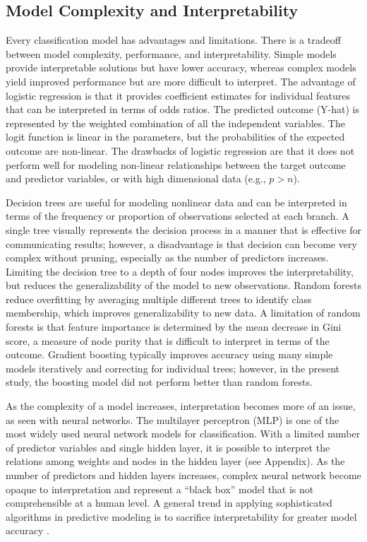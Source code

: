 \documentclass[sigconf]{acmart}
\begin{document}
\subsection{Model Complexity and Interpretability}

Every classification model has advantages and limitations. There is a 
tradeoff between model complexity, performance, and interpretability.
Simple models provide interpretable solutions but have lower accuracy, 
whereas complex models yield improved performance but are more difficult 
to interpret. The advantage of logistic regression is that it provides 
coefficient estimates for individual features that can be interpreted in 
terms of odds ratios. The predicted outcome (Y-hat) is represented by the
weighted combination of all the independent variables. The logit function 
is linear in the parameters, but the probabilities of the expected outcome 
are non-linear. The drawbacks of logistic regression are that it does not 
perform well for modeling non-linear relationships between the target
outcome and predictor variables, or with high dimensional data (e.g., $p>n$). 

Decision trees are useful for modeling nonlinear data and can be 
interpreted in terms of the frequency or proportion of observations selected 
at each branch. A single tree visually represents the decision process in a 
manner that is effective for communicating results; however, a disadvantage 
is that decision can become very complex without pruning, especially as the 
number of predictors increases. Limiting the decision tree to a depth of four 
nodes improves the interpretability, but reduces the generalizability of the 
model to new observations. Random forests reduce overfitting by averaging
multiple different trees to identify class membership, which improves 
generalizability to new data. A limitation of random forests is that feature 
importance is determined by the mean decrease in Gini score, a measure of node
purity that is difficult to interpret in terms of the outcome. Gradient 
boosting typically improves accuracy using many simple models iteratively and 
correcting for individual trees; however, in the present study, the boosting 
model did not perform better than random forests. 

As the complexity of a model increases, interpretation becomes more of an 
issue, as seen with neural networks. The multilayer perceptron (MLP) is 
one of the most widely used neural network models for classification. With a
limited number of predictor variables and single hidden layer, it is possible 
to interpret the relations among weights and nodes in the hidden layer 
(see Appendix). As the number of predictors and hidden layers increases, 
complex neural network become opaque to interpretation and represent a 
``black box'' model that is not comprehensible at a human level. A general 
trend in applying sophisticated algorithms in predictive modeling is to 
sacrifice interpretability for greater model accuracy \cite{elgin18}. 
\end{document}
